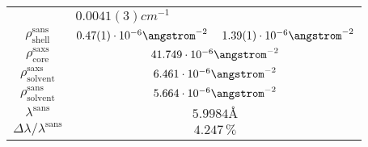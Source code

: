 \documentclass[\main/dresen_thesis.tex]{subfiles}
\begin{document}
\begin{table}[ht]
\begin{tabular}{ c | l | l }
          & $0.0041(3) \unit{cm}^{-1}$\\
        $\rho_\mathrm{shell}^\mathrm{sans}$
          & $0.47(1) \cdot 10^{-6} \angstrom^{-2}$
          & $1.39(1) \cdot 10^{-6} \angstrom^{-2}$\\
        \hline
        $\rho_\mathrm{core}^\mathrm{saxs}$
          & \multicolumn{2}{c}{$41.749 \cdot 10^{-6} \angstrom^{-2}$}\\
        $\rho_\mathrm{solvent}^\mathrm{saxs}$
          & \multicolumn{2}{c}{$6.461 \cdot 10^{-6} \angstrom^{-2}$}\\
        $\rho_\mathrm{solvent}^\mathrm{sans}$
          & \multicolumn{2}{c}{$5.664 \cdot 10^{-6} \angstrom^{-2}$}\\
        $\lambda^\mathrm{sans}$
          & \multicolumn{2}{c}{$5.9984 \unit{\angstrom}$}\\
        $\Delta \lambda / \lambda ^\mathrm{sans}$
          & \multicolumn{2}{c}{$4.247 \, \%$}\\
        \hline
      \end{tabular}
    \end{table}
\end{document}
